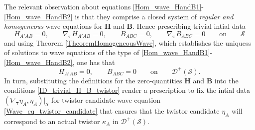 \documentclass[10pt,a4paper]{article}
\theoremstyle{plain}
\def\bmB{{\bm B}}
\def\bmH{{\bm H}}
\begin{document}
The relevant observation about equations
\eqref{Hom_wave_HandB1}-\eqref{Hom_wave_HandB2} is that they
comprise a closed system of \emph{regular and homogeneous}
wave equations for $\bmH$ and $\bmB$.
Hence prescribing trivial intial data
\[
H_{A'AB}=0, \qquad \nabla_{\bm\tau} H_{A'AB}=0, \qquad B_{ABC}=0, \qquad \nabla_{\bm\tau} B_{ABC}=0 \qquad \text{on} \qquad \mathcal{S}
\]
and using Theorem \ref{TheoremHomogeneousWave}, which establishes the
uniquess of solutions to wave equations of the type
of \eqref{Hom_wave_HandB1}-\eqref{Hom_wave_HandB2}, one has that 
\begin{equation}\label{ID_trivial_H_B_twistor}
H_{A'AB}=0, \qquad B_{ABC}=0 \qquad \text{on} \qquad \mathcal{D}^{+}(\mathcal{S}) .
\end{equation}
In turn, substituting the definitions for the zero-quantities $\bmH$
and $\bmB$ into the conditions \eqref{ID_trivial_H_B_twistor} render a
prescription to fix the intial data $(\nabla_{\bm\tau} \eta_A,
\eta_A)|_\mathcal{S}$ for  twistor
candidate wave equation \eqref{Wave_eq_twistor_candidate} that ensures that
 the twistor candidate $\eta_A$ will
correspond to an actual twistor $\kappa_A$ in $\mathcal{D}^{+}(\mathcal{S})$.
\\
\end{document}
